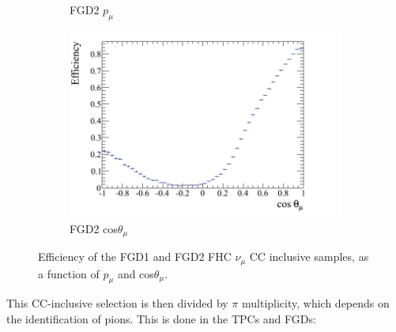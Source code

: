 \begin{figure}
\begin{subfigure}{.48\textwidth}
  \caption{FGD2 $p_{\mu}$}
\end{subfigure}
\begin{subfigure}{.48\textwidth}
  \centering
  \includegraphics[width=0.95\linewidth]{figs/effcosfgd2numu}
  \caption{FGD2 cos$\theta_{\mu}$}
\end{subfigure}
\caption{Efficiency of the FGD1 and FGD2 FHC $\nu_{\mu}$ CC inclusive samples, as a function of $p_{\mu}$ and cos$\theta_{\mu}$.}
\label{fig:numueff}
\end{figure}

This CC-inclusive selection is then divided by $\pi$ multiplicity, which depends on the identification of pions. This is done in the TPCs and FGDs:

